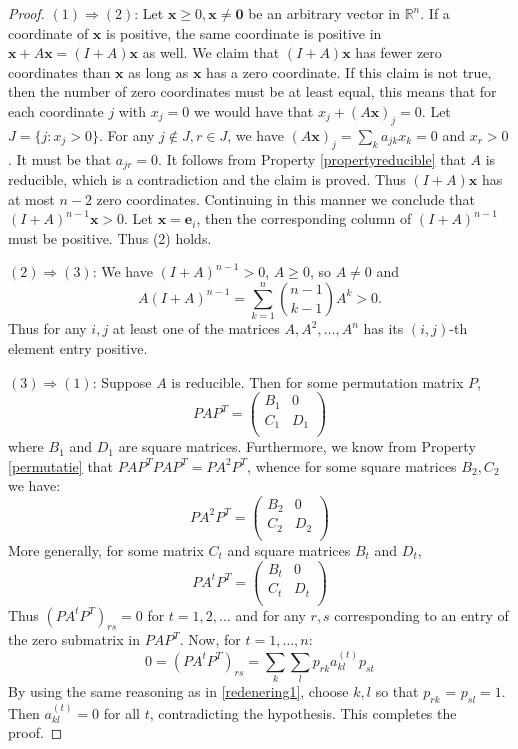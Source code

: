 \documentclass[a4paper,11pt]{report}
\newcommand{\R}{{\mathbb R}}
\begin{document}
\begin{proof}
  
  $(1) \Rightarrow (2)$: Let $\mathbf{x} \geq 0, \mathbf{x} \not = \mathbf{0}$ be an arbitrary vector in $\R^n$.
  If a coordinate of $\mathbf{x}$ is positive, the same coordinate is positive  in $\mathbf{x} + A\mathbf{x} = (I+A)\mathbf{x}$ 
  as well. We claim that $(I+A)\mathbf{x}$ has fewer zero coordinates than 
  $\mathbf{x}$ as long as $\mathbf{x}$ has a zero coordinate. If this claim is 
  not true, then the number of zero coordinates must be at least equal,
  this means that for each coordinate $j$ with $x_j = 0$ we would have that $x_j+ (A\mathbf{x})_j= 0$. Let $J = \{j: x_j > 0\}.$ For any $j \not \in J, r\in J$, we have 
  $(A\mathbf{x})_j = \sum_k a_{jk}x_k = 0$ and $x_r > 0$. 
  It must be that $a_{jr} = 0$. It follows from Property \ref{propertyreducible} that $A$ 
  is reducible, which is a contradiction and the claim is proved. Thus $(I+A)\mathbf{x}$ 
  has at most $n-2$ zero coordinates. Continuing in this manner we conclude that 
  $(I + A)^{n-1}\mathbf{x} > 0$. Let $\mathbf{x} = \mathbf{e}_i$, then the corresponding column of $(I+A)^{n-1}$ must be 
  positive. Thus (2) holds.
  
  $(2) \Rightarrow (3)$: We have $(I + A)^{n-1} > 0$, $A \geq 0$, so $A \not = 0$ 
  and 
  $$A(I+A)^{n-1} = \sum_{k=1}^n {n-1 \choose k-1} A^k > 0.$$
Thus for any $i, j$ at least one of the matrices $A, A^2,\ldots, A^n$ has its 
$(i,j)$-th element entry positive.

$(3) \Rightarrow (1)$: Suppose $A$ is reducible. Then for some permutation 
matrix $P$,
$$PAP^T = \begin{pmatrix}  B_1  & 0\\
 C_1  & D_1\\
\end{pmatrix} $$
where $B_1$ and $D_1$ are square matrices. Furthermore, we know from Property \ref{permutatie} that 
$PAP^TPAP^T = PA^2P^T$,
whence for some square matrices $B_2, C_2$ we have:
$$PA^2P^T = \begin{pmatrix}  B_2  & 0\\
 C_2  & D_2\\
\end{pmatrix} $$
More generally, for some matrix $C_t$ and square matrices $B_t$ and $D_t$,
$$PA^tP^T = \begin{pmatrix}  B_t  & 0\\
 C_t & D_t\\
\end{pmatrix} $$
Thus $(PA^tP^T)_{rs} = 0$ for $t = 1, 2,\ldots$ and for any $r,s$ 
corresponding to an entry of the zero submatrix in $PAP^T$.
Now, for $t = 1,\ldots,n:$
$$0 = (PA^tP^T)_{rs} = \sum_k\sum_l p_{r k}a_{kl}^{(t)}p_{s t}$$
By using the same reasoning as in \ref{redenering1}, choose $k,l$ so that $p_{r k}$ = $p_{s l} = 1$. Then $a^{(t)}_{kl} = 0$ for all $t$,
contradicting the hypothesis. This completes the proof. 
 \end{proof}
 
\end{document}
